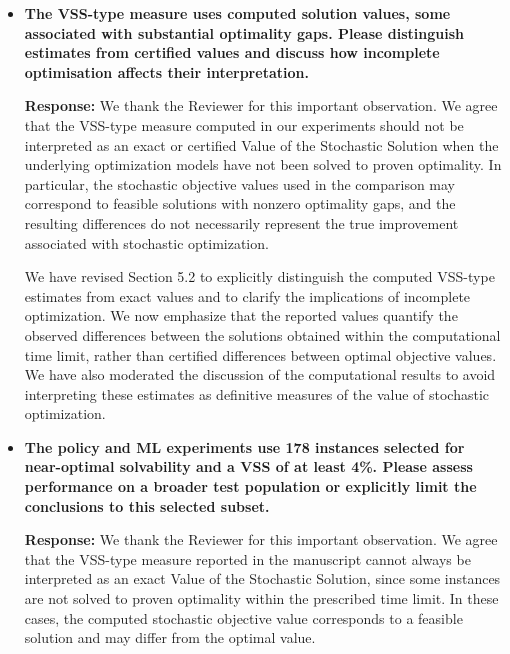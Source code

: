 \documentclass[11pt]{article}
\begin{document}
\begin{enumerate}
\begin{itemize}
We have revised Section 5.2 to make this distinction explicit. We have also expanded the discussion of Table 5 to explain that the difficulty of the scenario-based formulation arises from the interaction between routing, scheduling, stochastic demand accumulation, capacity saturation, and scenario-dependent route skipping. These features can make the identification of feasible solutions challenging even for instances with relatively few collection points.



\item \textbf{The VSS-type measure uses computed solution values, some associated with substantial
optimality gaps. Please distinguish estimates from certified values and discuss how incomplete optimisation affects their interpretation.}


\noindent\textbf{Response:} We thank the Reviewer for this important observation. We agree that the VSS-type measure computed in our experiments should not be interpreted as an exact or certified Value of the Stochastic Solution when the underlying optimization models have not been solved to proven optimality. In particular, the stochastic objective values used in the comparison may correspond to feasible solutions with nonzero optimality gaps, and the resulting differences do not necessarily represent the true improvement associated with stochastic optimization.

We have revised Section 5.2 to explicitly distinguish the computed VSS-type estimates from exact values and to clarify the implications of incomplete optimization. We now emphasize that the reported values quantify the observed differences between the solutions obtained within the computational time limit, rather than certified differences between optimal objective values. We have also moderated the discussion of the computational results to avoid interpreting these estimates as definitive measures of the value of stochastic optimization.


\item \textbf{The policy and ML experiments use 178 instances selected for near-optimal solvability
and a VSS of at least 4\%. Please assess performance on a broader test population or
explicitly limit the conclusions to this selected subset.}


\noindent\textbf{Response:} We thank the Reviewer for this important observation. We agree that the VSS-type measure reported in the manuscript cannot always be interpreted as an exact Value of the Stochastic Solution, since some instances are not solved to proven optimality within the prescribed time limit. In these cases, the computed stochastic objective value corresponds to a feasible solution and may differ from the optimal value.


\end{itemize}
\end{enumerate}
\end{document}
